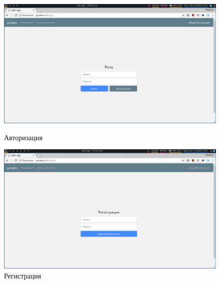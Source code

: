 \begin{figure}[h!]
    \centering
    \includegraphics[width=\textwidth]{./screenshots/login.png}
    \caption{Авторизация}
    \endminipage\hfill
    \includegraphics[width=\textwidth]{./screenshots/register.png}
    \caption{Регистрация}
    \endminipage
\end{figure}

